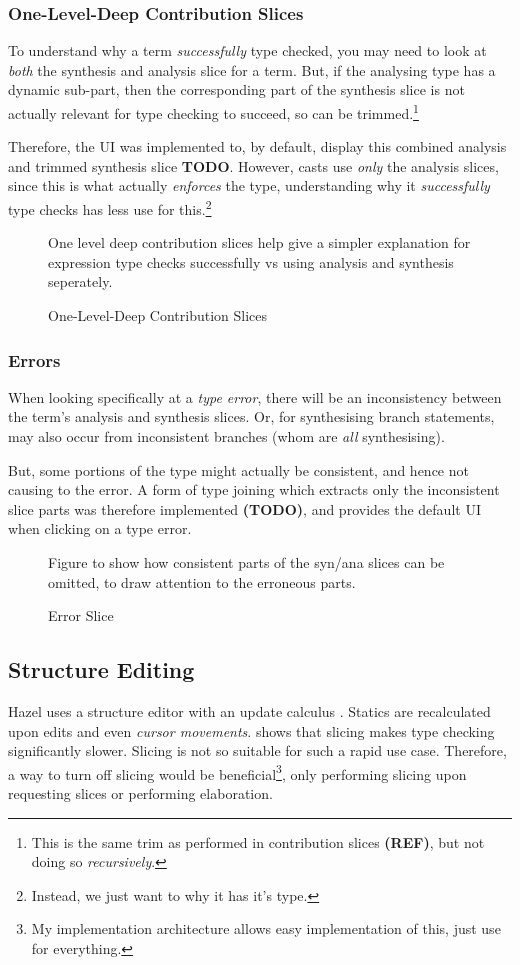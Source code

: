 \subsubsection{One-Level-Deep Contribution Slices}
To understand why a term \textit{successfully} type checked, you may need to look at \textit{both} the synthesis and analysis slice for a term. But, if the analysing type has a dynamic sub-part, then the corresponding part of the synthesis slice is not actually relevant for type checking to succeed, so can be trimmed.\footnote{This is the same trim as performed  in contribution slices \textbf{(REF)}, but not doing so \textit{recursively}.} 

Therefore, the UI was implemented to, by default, display this combined analysis and trimmed synthesis slice \textbf{TODO}. However, casts use \textit{only} the analysis slices, since this is what actually \textit{enforces} the type, understanding why it \textit{successfully} type checks has less use for this.\footnote{Instead, we just want to why it has it's type.}

\begin{figure}
One level deep contribution slices help give a simpler explanation for expression type checks successfully vs using analysis and synthesis seperately.
\caption{One-Level-Deep Contribution Slices}
\end{figure}

\subsubsection{Errors}
When looking specifically at a \textit{type error}, there will be an inconsistency between the term's analysis and synthesis slices. Or, for synthesising branch statements, may also occur from inconsistent branches (whom are \textit{all} synthesising).

But, some portions of the type might actually be consistent, and hence not causing to the error. A form of type joining which extracts only the inconsistent slice parts was therefore implemented \textbf{(TODO)}, and provides the default UI when clicking on a type error.

\begin{figure}
Figure to show how consistent parts of the syn/ana slices can be omitted, to draw attention to the erroneous parts.
\caption{Error Slice}
\end{figure}

\subsection{Structure Editing}
Hazel uses a structure editor with an update calculus \cite{HazelStructureCalculus}. Statics are recalculated upon edits and even \textit{cursor movements}.  shows that slicing makes type checking significantly slower. Slicing is not so suitable for such a rapid use case. Therefore, a way to turn off slicing would be beneficial\footnote{My implementation architecture allows easy implementation of this, just use  for everything.}, only performing slicing upon requesting slices or performing elaboration.

